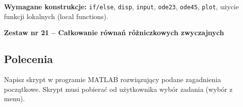 \documentclass[a4paper,11pt]{article}
\begin{document}
\vspace{0.3cm}
\begin{ramka}
\textbf{Wymagane konstrukcje:}
\texttt{if/else}, \texttt{disp}, \texttt{input}, \texttt{ode23}, \texttt{ode45}, \texttt{plot}, użycie funkcji lokalnych (local functions).
\end{ramka}

\clearpage
\begin{center}
  {\large\bfseries Zestaw nr 21 \quad -- \quad Całkowanie równań różniczkowych zwyczajnych}
\end{center}
\hrulefill
\vspace{0.4cm}

\subsection*{Polecenia}

Napisz skrypt w programie MATLAB rozwiązujący podane zagadnienia początkowe. Skrypt musi pobierać od użytkownika wybór zadania (wybór z menu).
\end{document}
